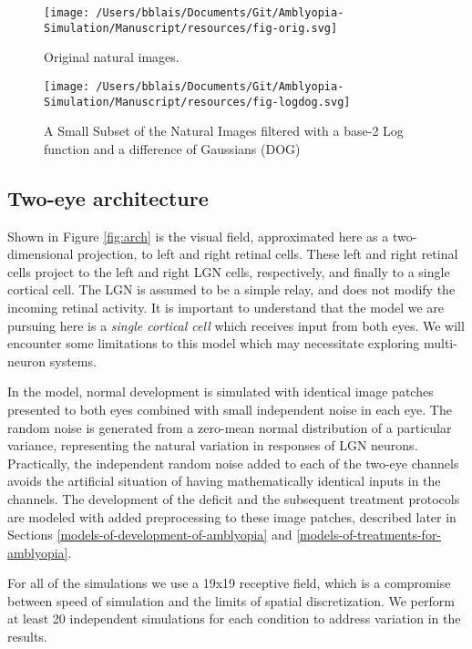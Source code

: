 \documentclass[
  onecolumn]{article}
\begin{document}
\begin{figure}
\hypertarget{fig:orig}{%
\centering
\texttt{[image: /Users/bblais/Documents/Git/Amblyopia-Simulation/Manuscript/resources/fig-orig.svg]}
\caption{Original natural images.}\label{fig:orig}
}
\end{figure}

\begin{figure}
\hypertarget{fig:logdog}{%
\centering
\texttt{[image: /Users/bblais/Documents/Git/Amblyopia-Simulation/Manuscript/resources/fig-logdog.svg]}
\caption{A Small Subset of the Natural Images filtered with a base-2 Log
function and a difference of Gaussians (DOG)}\label{fig:logdog}
}
\end{figure}

\hypertarget{two-eye-architecture}{%
\subsection{Two-eye architecture}\label{two-eye-architecture}}

Shown in Figure \ref{fig:arch} is the visual field, approximated here as
a two-dimensional projection, to left and right retinal cells. These
left and right retinal cells project to the left and right LGN cells,
respectively, and finally to a single cortical cell. The LGN is assumed
to be a simple relay, and does not modify the incoming retinal activity.
It is important to understand that the model we are pursuing here is a
\emph{single cortical cell} which receives input from both eyes. We will
encounter some limitations to this model which may necessitate exploring
multi-neuron systems.

In the model, normal development is simulated with identical image
patches presented to both eyes combined with small independent noise in
each eye. The random noise is generated from a zero-mean normal
distribution of a particular variance, representing the natural
variation in responses of LGN neurons. Practically, the independent
random noise added to each of the two-eye channels avoids the artificial
situation of having mathematically identical inputs in the channels. The
development of the deficit and the subsequent treatment protocols are
modeled with added preprocessing to these image patches, described later
in Sections \ref{models-of-development-of-amblyopia} and
\ref{models-of-treatments-for-amblyopia}.

For all of the simulations we use a 19x19 receptive field, which is a
compromise between speed of simulation and the limits of spatial
discretization. We perform at least 20 independent simulations for each
condition to address variation in the results.
\end{document}
